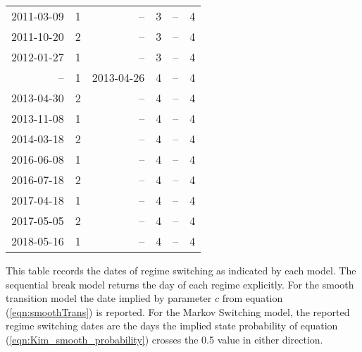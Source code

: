\documentclass[12pt]{article}
\begin{document}
\begin{table}
\begin{tabular}[c]{r r | r r | r r}
		2011-03-09 &  1 &         -- &  3 &         -- &  4 \\
		2011-10-20 &  2 &         -- &  3 &         -- &  4 \\
		2012-01-27 &  1 &         -- &  3 &         -- &  4 \\
		        -- &  1 & 2013-04-26 &  4 &         -- &  4 \\
		2013-04-30 &  2 &         -- &  4 &         -- &  4 \\
		2013-11-08 &  1 &         -- &  4 &         -- &  4 \\
		2014-03-18 &  2 &         -- &  4 &         -- &  4 \\
		2016-06-08 &  1 &         -- &  4 &         -- &  4 \\
		2016-07-18 &  2 &         -- &  4 &         -- &  4 \\
		2017-04-18 &  1 &         -- &  4 &         -- &  4 \\
		2017-05-05 &  2 &         -- &  4 &         -- &  4 \\
		2018-05-16 &  1 &         -- &  4 &         -- &  4 \\
		\hline
	\end{tabular}
	\begin{tablenotes}
		\item{\footnotesize This table records the dates of regime switching as indicated by each model. The sequential break model returns the day of each regime explicitly. For the smooth transition model the date implied by parameter $c$ from equation (\ref{eqn:smoothTrans}) is reported. For the Markov Switching model, the reported regime switching dates are the days the implied state probability of equation (\ref{eqn:Kim_smooth_probability}) crosses the 0.5 value in either direction.}
	\end{tablenotes}
	\label{tbl:regime_changes_euro_yen}
\end{table}
\end{document}
